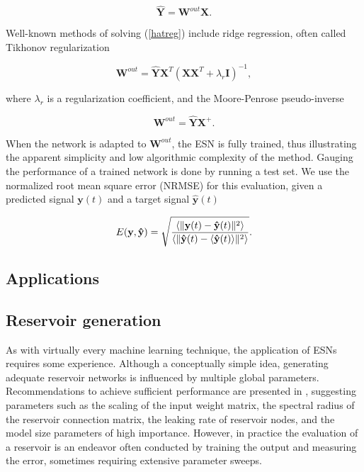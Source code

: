 \begin{equation}
  \mathbf{\hat{Y}} = \mathbf{W}^{out}\mathbf{X}.
  \label{hatreg}
\end{equation}

Well-known methods of solving (\ref{hatreg}) include ridge regression, often
called Tikhonov regularization

\begin{equation}
  \mathbf{W}^{out} = \mathbf{\hat{Y}}\mathbf{X}^{T}
                    (\mathbf{X}\mathbf{X}^{T} + \lambda_{r}\mathbf{I})^{-1},
  \label{tikhonov}
\end{equation}

\noindent where $\lambda_{r}$ is a regularization coefficient, and the
Moore-Penrose pseudo-inverse

\begin{equation}
  \mathbf{W}^{out} = \mathbf{\hat{Y}}\mathbf{X}^{+}.
  \label{pseudo}
\end{equation}

When the network is adapted to $\mathbf{W}^{out}$, the ESN is fully trained,
thus illustrating the apparent simplicity and low algorithmic complexity of the
method. Gauging the performance of a trained network is done by running a test
set. We use the normalized root mean square error (NRMSE) for this evaluation,
given a predicted signal $\mathbf{y}(t)$ and a target signal
$\mathbf{\hat{y}}(t)$

\begin{equation}
  E(\mathbf{y}, \mathbf{\hat{y}}) = \sqrt{\frac{
      \langle\Vert \mathbf{y}(t) - \mathbf{\hat{y}}(t) \Vert^{2}\rangle
    }{
      \langle\Vert \mathbf{\hat{y}}(t) - \langle\mathbf{\hat{y}}(t)\rangle \Vert^{2}\rangle
    }
  }
  .
  \label{nrmse}
\end{equation}


\subsection{Applications}

\subsection{Reservoir generation}

As with virtually every machine learning technique, the application of ESNs
requires some experience. Although a conceptually simple idea, generating
adequate reservoir networks is influenced by multiple global
parameters. Recommendations to achieve sufficient performance are presented in
\cite{montavon_practical_2012, jaeger_tutorial_nodate}, suggesting parameters
such as the scaling of the input weight matrix, the spectral radius of the
reservoir connection matrix, the leaking rate of reservoir nodes, and the model
size parameters of high importance. However, in practice the evaluation of a
reservoir is an endeavor often conducted by training the output and measuring
the error, sometimes requiring extensive parameter sweeps.

